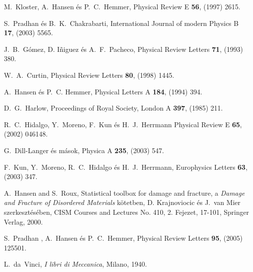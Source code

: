 \begin{thebibliography}{200}
\vspace*{-0.3cm}
 M.\ Kloster, A.\ Hansen \'es P.\ C.\ Hemmer, Physical Review E {\bf 56}, (1997) 2615.

\vspace*{-0.3cm}
 S.\ Pradhan \'es B.\ K.\ Chakrabarti, International Journal of modern Physics B {\bf 17}, (2003) 5565.

\vspace*{-0.3cm}
 J.\ B.\ G\'omez, D. I\~{n}iguez \'es A.\ F.\ Pacheco, Physical Review Letters {\bf 71}, (1993) 380.

\vspace*{-0.3cm}
 W.\ A.\ Curtin, Physical Review Letters {\bf 80}, (1998) 1445.

\vspace*{-0.3cm}
 A.\ Hansen \'es P.\ C. Hemmer, Physical Letters A {\bf 184}, (1994) 394.

\vspace*{-0.3cm}
 D.\ G.\ Harlow, Proceedings of Royal Society, London A {\bf 397}, (1985) 211.

\vspace*{-0.3cm}
 R.\ C.\ Hidalgo, Y.\ Moreno, F.\ Kun \'es H.\ J.\ Herrmann Physical Review E {\bf 65}, (2002) 046148.

\vspace*{-0.3cm}
 G.\ Dill-Langer \'es m\'asok, Physica A {\bf 235}, (2003) 547.

\vspace*{-0.3cm}
 F.\ Kun, Y.\ Moreno, R.\ C.\ Hidalgo \'es H.\ J.\ Herrmann, Europhysics Letters {\bf 63}, (2003) 347.

\vspace*{-0.3cm}
 A.\ Hansen and S.\ Roux, Statistical toolbox for damage and fracture, a {\it Damage and Fracture of Disordered Materials} kötetben, D. Krajnoviocic \'es J.\ van Mier szerkeszt\'es\'eben, CISM Courses and Lectures No. 410, 2. Fejezet, 17-101, Springer Verlag, 2000.

\vspace*{-0.3cm}
 S.\ Pradhan , A.\ Hansen \'es P.\ C.\ Hemmer, Physical Review Letters {\bf 95}, (2005) 125501.

\vspace*{-0.3cm}
 L.\ da\ Vinci, {\it I libri di Meccanica}, Milano, 1940.


\end{thebibliography}
